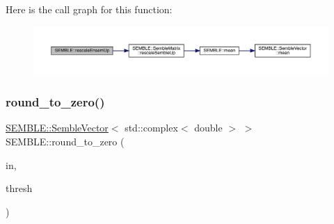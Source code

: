 Here is the call graph for this function\+:
\nopagebreak
\begin{figure}[H]
\begin{center}
\leavevmode
\includegraphics[width=350pt]{d7/dfd/namespaceSEMBLE_ac55fb3abdab6794f5e717ff5c2e4931c_cgraph}
\end{center}
\end{figure}
\mbox{\label{namespaceSEMBLE_a29461d5fa5230523d54ef8f4a974904b}} 
\subsubsection{\texorpdfstring{round\_to\_zero()}{round\_to\_zero()}\hspace{0.1cm}{\footnotesize\ttfamily [1/2]}}
{\footnotesize\ttfamily \mbox{\hyperlink{structSEMBLE_1_1SembleVector}{S\+E\+M\+B\+L\+E\+::\+Semble\+Vector}}$<$ std\+::complex$<$ double $>$ $>$ S\+E\+M\+B\+L\+E\+::round\+\_\+to\+\_\+zero (\begin{DoxyParamCaption}\item[{const \mbox{\hyperlink{structSEMBLE_1_1SembleVector}{S\+E\+M\+B\+L\+E\+::\+Semble\+Vector}}$<$ std\+::complex$<$ double $>$ $>$ \&}]{in,  }\item[{const double}]{thresh }\end{DoxyParamCaption})}

